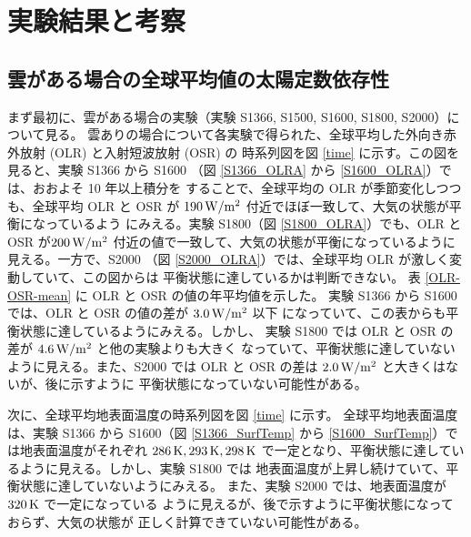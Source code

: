 \documentclass[body]{subfiles}
\begin{document}
\chapter{実験結果と考察}\label{result}

\section{雲がある場合の全球平均値の太陽定数依存性}

まず最初に、雲がある場合の実験（実験 S1366, S1500, S1600, S1800, S2000）に
ついて見る。
雲ありの場合について各実験で得られた、全球平均した外向き赤外放射 (OLR) と入射短波放射 (OSR) の
時系列図を図 \ref{time} に示す。この図を見ると、実験 S1366 から S1600
（図 \ref{S1366_OLRA} から \ref{S1600_OLRA}）では、おおよそ 10 年以上積分を
することで、全球平均の OLR が季節変化しつつも、全球平均 OLR と OSR が
\(190\hmu{W/m^2}\) 付近でほぼ一致して、大気の状態が平衡になっているよう
にみえる。実験 S1800（図 \ref{S1800_OLRA}）でも、OLR と OSR が\(200\hmu{W/m^2}\)
付近の値で一致して、大気の状態が平衡になっているように見える。一方で、S2000
（図 \ref{S2000_OLRA}）では、全球平均 OLR が激しく変動していて、この図からは
平衡状態に達しているかは判断できない。
表 \ref{OLR-OSR-mean} に OLR と OSR の値の年平均値を示した。
実験 S1366 から S1600 では、OLR と OSR の値の差が \(3.0\hmu{W/m^2}\) 以下
になっていて、この表からも平衡状態に達しているようにみえる。しかし、
実験 S1800 では OLR と OSR の差が \(4.6\hmu{W/m^2}\) と他の実験よりも大きく
なっていて、平衡状態に達していないように見える。また、S2000 では OLR と
OSR の差は \(2.0\hmu{W/m^2}\) と大きくはないが、後に示すように
平衡状態になっていない可能性がある。

次に、全球平均地表面温度の時系列図を図 \ref{time} に示す。
全球平均地表面温度は、実験 S1366 から S1600（図 \ref{S1366_SurfTemp} から
\ref{S1600_SurfTemp}）では地表面温度がそれぞれ \(286\hmu{K}, 293\hmu{K}, 298\hmu{K}\)
で一定となり、平衡状態に達しているように見える。しかし、実験 S1800 では
地表面温度が上昇し続けていて、平衡状態に達していないようにみえる。
また、実験 S2000 では、地表面温度が \(320\hmu{K}\) で一定になっている
ように見えるが、後で示すように平衡状態になっておらず、大気の状態が
正しく計算できていない可能性がある。

\end{document}
